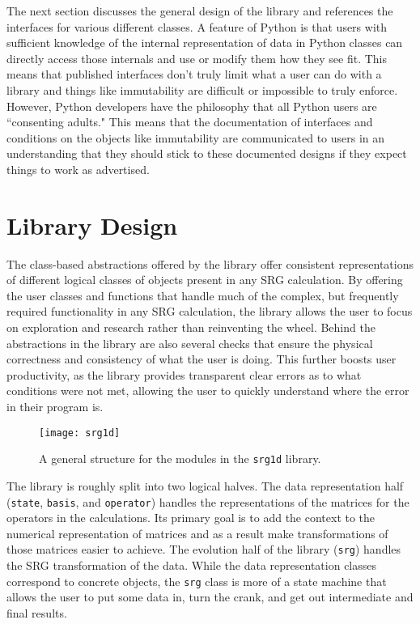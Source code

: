 The next section discusses the general design of the library and references the interfaces for various different classes. A feature of Python is that users with sufficient knowledge of the internal representation of data in Python classes can directly access those internals and use or modify them how they see fit. This means that published interfaces don't truly limit what a user can do with a library and things like immutability are difficult or impossible to truly enforce. However, Python developers have the philosophy that all Python users are ``consenting adults." This means that the documentation of interfaces and conditions on the objects like immutability are communicated to users in an understanding that they should stick to these documented designs if they expect things to work as advertised.

\section{Library Design}

The class-based abstractions offered by the library offer consistent representations of different logical classes of objects present in any SRG calculation. By offering the user classes and functions that handle much of the complex, but frequently required functionality in any SRG calculation, the library allows the user to focus on exploration and research rather than reinventing the wheel. Behind the abstractions in the library are also several checks that ensure the physical correctness and consistency of what the user is doing. This further boosts user productivity, as the library provides transparent clear errors as to what conditions were not met, allowing the user to quickly understand where the error in their program is.

\begin{figure}[t]
\begin{center}
\texttt{[image: srg1d]}
\end{center}
\caption{A general structure for the modules in the \texttt{srg1d} library.}
\label{fig:srg1d}
\end{figure}

The library is roughly split into two logical halves. The data representation half (\texttt{state}, \texttt{basis}, and \texttt{operator}) handles the representations of the matrices for the operators in the calculations. Its primary goal is to add the context to the numerical representation of matrices and as a result make transformations of those matrices easier to achieve. The evolution half of the library (\texttt{srg}) handles the SRG transformation of the data. While the data representation classes correspond to concrete objects, the \texttt{srg} class is more of a state machine that allows the user to put some data in, turn the crank, and get out intermediate and final results.

